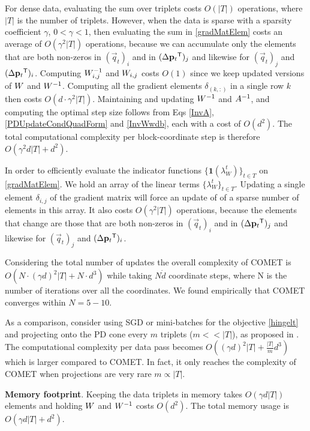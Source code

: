\documentclass{article}
\begin{document}
For dense data, evaluating the sum over triplets costs $O(|T|)$ operations, where $|T|$ is the number of triplets. However, when the  data is sparse with a sparsity coefficient $\gamma$,  $ 0< \gamma <1 $, then evaluating the sum in \eqref{gradMatElem} costs an average of $O(\gamma^2 |T|)$ operations, because we can accumulate only the elements that are both non-zeros in $(\vec{q}_{t})_i$ and in $(\Delta\mathbf{p}_{t}{}^\mathsf{T})_j  $ and likewise for $(\vec{q}_{t})_j$ and $(\Delta\mathbf{p}_{t}{}^\mathsf{T})_i$. Computing ${W}^{-1}_{i,j}$ and ${W}_{i,j}$ costs $O(1)$ since we keep updated versions of ${W}$ and ${W}^{-1}$. Computing all the gradient elements $\delta_{(k,:)}$ in a single row $k$ then costs $O(d\cdot \gamma^2 |T|)$. Maintaining and updating ${W}^{-1}$ and $A^{-1}$, and computing the optimal step size follows from Eqs \ref{InvA}, \ref{PDUpdateCondQuadForm} and \ref{InvWwdb}, each with a cost of $O(d^2)$. The total computational complexity per block-coordinate step is therefore $O(\gamma^2 d |T| + d^2)$.

In order to efficiently evaluate the indicator functions $\{ \textbf{1}(\lambda_{W}^t) \}_{t \in T}$ on \eqref{gradMatElem}. We hold an array of the linear terms $\{\lambda_{W}^t\}_{t \in T}$. Updating a single element $\delta_{i,j}$ of the gradient matrix will force an update of of a sparse number of elements in this array. It also costs $O(\gamma^2 |T|)$ operations, because the elements that change are those that are both non-zeros in $(\vec{q}_{t})_i$ and in $(\Delta\mathbf{p}_{t}{}^\mathsf{T})_j$ and likewise for $(\vec{q}_{t})_j$ and $(\Delta\mathbf{p}_{t}{}^\mathsf{T})_i$.

Considering the total number of updates 
the overall complexity of COMET is $O(N \cdot (\gamma d)^2 |T| + N \cdot d^3)$ while taking $N \dot d$ coordinate steps, where N is the number of iterations over all the coordinates. We found empirically that COMET converges within $N= 5 - 10$.

As a comparison, consider using SGD or mini-batches for the objective \eqref{hingelt} and projecting onto the PD cone every $m$ triplets ($m << |T|$), as proposed in \citet{OASIS,qian}. The computational complexity per data pass becomes $O((\gamma d)^2 |T| + \frac{|T|}{m} d^3)$ which is larger compared to COMET. In fact, it only reaches the complexity of COMET when projections are very rare $m \propto |T|$.


{\bf Memory footprint}. Keeping the data triplets in memory takes $O(\gamma d |T|)$ elements and holding ${W}$ and ${W}^{-1}$ costs $O(d^2)$. The total memory usage is $O(\gamma d |T| + d^2)$. %
\end{document}
